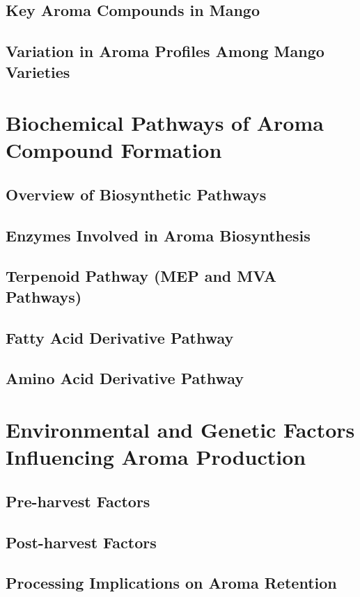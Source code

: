 \subsection{Key Aroma Compounds in Mango}
\subsection{Variation in Aroma Profiles Among Mango Varieties}


\section{Biochemical Pathways of Aroma Compound Formation}
\subsection{Overview of Biosynthetic Pathways}
\subsection{Enzymes Involved in Aroma Biosynthesis}
\subsection{Terpenoid Pathway (MEP and MVA Pathways)}
\subsection{Fatty Acid Derivative Pathway}
\subsection{Amino Acid Derivative Pathway}


\section{Environmental and Genetic Factors Influencing Aroma Production}
\subsection{Pre-harvest Factors}
\subsection{Post-harvest Factors}
\subsection{Processing Implications on Aroma Retention}


